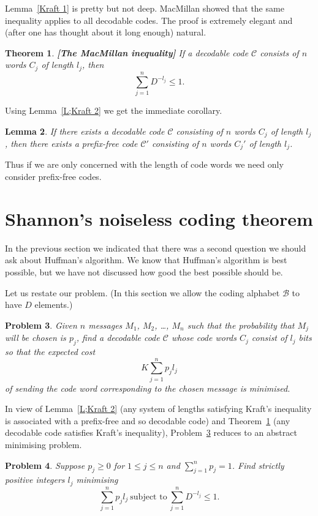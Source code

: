 \documentclass[12pt,a4paper]{article}
\theoremstyle{plain}
\newtheorem{theorem}{Theorem}[section]
\newtheorem{lemma}[theorem]{Lemma}
\newtheorem{problem}[theorem]{Problem}
\theoremstyle{definition}
\begin{document}
    Lemma~\ref{Kraft 1} is pretty but not deep.
    MacMillan showed that the same inequality
    applies to all decodable codes. The proof is extremely
    elegant and (after one has thought about it
    long enough) natural.
    \begin{theorem}
        \label{T;MacMillan}{\bf [The MacMillan inequality]}
        If a decodable code ${\mathcal C}$ consists
        of $n$ words $C_{j}$ of length $l_{j}$, then
        \[\sum_{j=1}^{n}D^{-l_{j}}\leq 1.\]
    \end{theorem}
    Using Lemma~\ref{L;Kraft 2} we get the immediate corollary.
    \begin{lemma}
        If there exists a decodable code ${\mathcal C}$
        consisting
        of $n$ words $C_{j}$ of length $l_{j}$, then
        there exists a prefix-free code ${\mathcal C}'$
        consisting
        of $n$ words $C_{j}'$ of length $l_{j}$.
    \end{lemma}
    Thus if we are only concerned with the length of code words
    we need only consider prefix-free codes.
    \section{Shannon's noiseless coding theorem}
    In the previous section we indicated that there
    was a second question we should ask about Huffman's
    algorithm. We know that Huffman's algorithm is
    best possible, but we have not discussed how good the
    best possible should be.

    Let us restate our problem. (In this section we allow
    the coding alphabet ${\mathcal B}$ to have $D$ elements.)
    \begin{problem}
        \label{P;Compress two}
        Given $n$ messages $M_{1}$, $M_{2}$,
        \dots, $M_{n}$ such that the probability that $M_{j}$
        will be chosen is $p_{j}$, find a decodable
        code ${\mathcal C}$ whose code words  $C_{j}$
        consist of $l_{j}$ bits so that the expected cost
        \[K\sum_{j=1}^{n}p_{j}l_{j}\]
        of sending the code word corresponding to the chosen
        message is minimised.
    \end{problem}
    In view of Lemma~\ref{L;Kraft 2}
    (any system of lengths
    satisfying Kraft's inequality is associated
    with a prefix-free and so decodable code)
    and Theorem~\ref{T;MacMillan} (any decodable
    code satisfies Kraft's inequality),
    Problem~\ref{P;Compress two} reduces to
    an abstract minimising problem.
    \begin{problem}
        \label{P;Compress three}
        Suppose $p_{j}\geq 0$ for $1\leq j\leq n$ and $\sum_{j=1}^{n}p_{j}=1$.
        Find strictly positive integers $l_{j}$  minimising
        \[\sum_{j=1}^{n}p_{j}l_{j}\ \text{subject to}
        \ \sum_{j=1}^{n}D^{-l_{j}}\leq 1.\]
    \end{problem}
\end{document}
